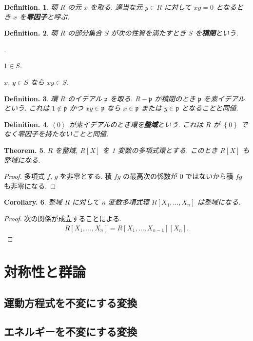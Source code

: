 \documentclass[openany, a4paper, oneside]{jsbook}
\newcounter{enum2}
\renewenvironment{enumerate}{%
\begin{list}%
{%
\arabic{enum2}.\ \,%
}%
{%
\usecounter{enum2}
\setlength{\itemindent}{0pt}%
\setlength{\leftmargin}{15pt}%
\setlength{\rightmargin}{0pt}%
\setlength{\labelsep}{0pt}%
\setlength{\labelwidth}{6pt}%
\setlength{\itemsep}{0pt}%
\setlength{\parsep}{0pt}%
\setlength{\listparindent}{0pt}%
}
}{%
\end{list}%
}
\theoremstyle{break}
\newtheorem{thm}{Theorem.}[section]
\newtheorem{cor}[thm]{Corollary.}
\theoremstyle{breakdefn}
\newtheorem{defn}[thm]{Definition.}
\newcommand{\sqbk}[1]{\left[#1\right]}
\newcommand{\cbk}[1]{\left\{#1\right\}}
\newcommand{\abk}[1]{\left\langle #1 \right\rangle}
\newcommand{\frakp}{\mathfrak{p}}
\begin{document}
\begin{defn}
 環 $R$ の元 $x$ を取る.
 適当な元 $y \in R$ に対して $xy = 0$ となるとき $x$ を\textbf{零因子}と呼ぶ.
\end{defn}
\begin{defn}
 環 $R$ の部分集合 $S$ が次の性質を満たすとき $S$ を\textbf{積閉}という.
\begin{enumerate}
\item $1 \in S$.
\item $x$, $y \in S$ なら $xy \in S$.
\end{enumerate}
\end{defn}
\begin{defn}
 環 $R$ のイデアル $\frakp$ を取る.
 $R - \frakp$ が積閉のとき $\frakp$ を素イデアルという.
 これは $1 \notin \frakp$ かつ $xy \in \frakp$ なら $x \in \frakp$ または $y \in \frakp$ となることと同値.
\end{defn}
\begin{defn}
 $\abk{0}$ が素イデアルのとき環を\textbf{整域}という.
 これは $R$ が $\cbk{0}$ でなく零因子を持たないことと同値.
\end{defn}
\begin{thm}
 $R$ を整域, $R \sqbk{X}$ を 1 変数の多項式環とする.
 このとき $R \sqbk{X}$ も整域になる.
\end{thm}
\begin{proof}
多項式 $f$, $g$ を非零とする.
積 $fg$ の最高次の係数が $0$ ではないから積 $fg$ も非零になる.
\end{proof}
\begin{cor}
 整域 $R$ に対して $n$ 変数多項式環 $R \sqbk{X_1, \dots, X_n}$ は整域になる.
\end{cor}
\begin{proof}
次の関係が成立することによる.
\begin{align}
 R \sqbk{X_1, \dots, X_n}
 =
 R \sqbk{X_1, \dots, X_{n-1}} \sqbk{X_n}.
\end{align}
\end{proof}
\chapter{対称性と群論}

\section{運動方程式を不変にする変換}

\section{エネルギーを不変にする変換}
\end{document}
